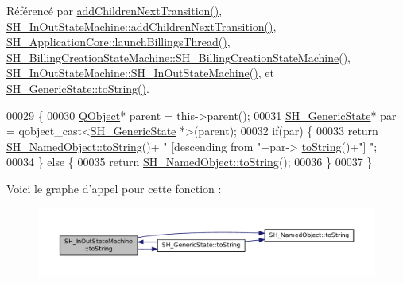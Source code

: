 Référencé par \hyperlink{classSh__LoopingInOutStateMachine_a20d5e4d9feea63bea747b45b7c10ca01}{add\-Children\-Next\-Transition()}, \hyperlink{classSH__InOutStateMachine_aa78420f8778d7777809aad77eb8473b4}{S\-H\-\_\-\-In\-Out\-State\-Machine\-::add\-Children\-Next\-Transition()}, \hyperlink{classSH__ApplicationCore_aa0777211696005ec89b2effe06190c3b}{S\-H\-\_\-\-Application\-Core\-::launch\-Billings\-Thread()}, \hyperlink{classSH__BillingCreationStateMachine_ad62b77fa4aeafe200056ff3974562f83}{S\-H\-\_\-\-Billing\-Creation\-State\-Machine\-::\-S\-H\-\_\-\-Billing\-Creation\-State\-Machine()}, \hyperlink{classSH__InOutStateMachine_abd780037922920c674b43d80c2b50d16}{S\-H\-\_\-\-In\-Out\-State\-Machine\-::\-S\-H\-\_\-\-In\-Out\-State\-Machine()}, et \hyperlink{classSH__GenericState_a7779babbb40f3f8faa71112204d9804f}{S\-H\-\_\-\-Generic\-State\-::to\-String()}.


\begin{DoxyCode}
00029 \{
00030     \hyperlink{classQObject}{QObject}* parent = this->parent();
00031     \hyperlink{classSH__GenericState}{SH\_GenericState}* par = qobject\_cast<\hyperlink{classSH__GenericState}{SH\_GenericState} *>(parent);
00032     \textcolor{keywordflow}{if}(par) \{
00033         \textcolor{keywordflow}{return} \hyperlink{classSH__NamedObject_a9f4b19df6a96a17daaf1060b3019ef47}{SH\_NamedObject::toString}()+ \textcolor{stringliteral}{" [descending from "}+par->
      \hyperlink{classSH__GenericState_a7779babbb40f3f8faa71112204d9804f}{toString}()+\textcolor{stringliteral}{"] "};
00034     \} \textcolor{keywordflow}{else} \{
00035         \textcolor{keywordflow}{return} \hyperlink{classSH__NamedObject_a9f4b19df6a96a17daaf1060b3019ef47}{SH\_NamedObject::toString}();
00036     \}
00037 \}
\end{DoxyCode}


Voici le graphe d'appel pour cette fonction \-:\nopagebreak
\begin{figure}[H]
\begin{center}
\leavevmode
\includegraphics[width=350pt]{classSH__InOutStateMachine_abfd2be3aa5860e0e92a1a6d30f8e36ce_cgraph}
\end{center}
\end{figure}




